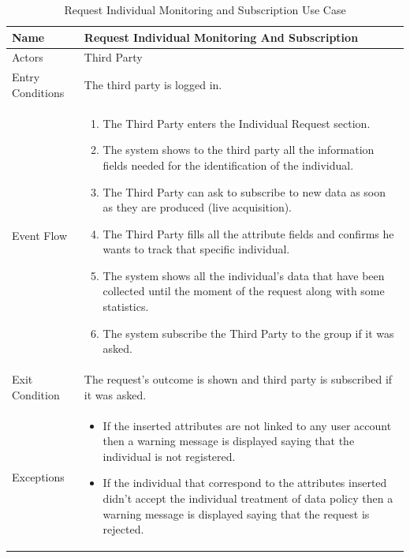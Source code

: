 \begin{enumerate}
\FloatBarrier
\begin{table}[h]
\begin{tabular}{|p{3.4cm}|p{}|}
\hline
Name             & Request Individual Monitoring And Subscription\\ \hline
Actors           & Third Party  \\ \hline
Entry Conditions & The third party is logged in.    \\ \hline
Event Flow       & \begin{enumerate}
            \item The Third Party enters the Individual Request section.         
            \item The system shows to the third party all the information fields needed for the identification of the individual.
            \item The Third Party can ask to subscribe to new data as soon as they are produced (live acquisition).
            \item The Third Party fills all the attribute fields and confirms he wants to track that specific individual.
            \item The system shows all the individual's data that have been collected until the moment of the request along with some statistics. 
            \item The system subscribe the Third Party to the group if it was asked. 
        \end{enumerate}\\ \hline
Exit Condition   & The request's outcome is shown and third party is subscribed if it was asked.\\ \hline
Exceptions       & \begin{itemize}
\item If the inserted attributes are not linked to any user account then a warning message is displayed saying that the individual is not registered.
\item If the individual that correspond to the attributes inserted didn't accept the individual treatment of data policy then a warning message is displayed saying that the request is rejected.
\end{itemize}\\ \hline
\end{tabular}
\caption{Request Individual Monitoring and Subscription Use Case}
\end{table}
\FloatBarrier


\end{enumerate}
